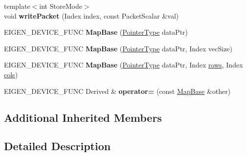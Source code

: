 \begin{DoxyCompactItemize}
{\footnotesize template$<$int Store\+Mode$>$ }\\void {\bfseries write\+Packet} (Index index, const Packet\+Scalar \&val)
\item 
\mbox{\label{class_eigen_1_1_map_base_3_01_derived_00_01_write_accessors_01_4_a41c11ab1e84f38b23ca4be87c62189d3}} 
E\+I\+G\+E\+N\+\_\+\+D\+E\+V\+I\+C\+E\+\_\+\+F\+U\+NC {\bfseries Map\+Base} (\mbox{\hyperlink{struct_eigen_1_1internal_1_1true__type}{Pointer\+Type}} data\+Ptr)
\item 
\mbox{\label{class_eigen_1_1_map_base_3_01_derived_00_01_write_accessors_01_4_a5f67bed14fedc7ab503238016e6bb36d}} 
E\+I\+G\+E\+N\+\_\+\+D\+E\+V\+I\+C\+E\+\_\+\+F\+U\+NC {\bfseries Map\+Base} (\mbox{\hyperlink{struct_eigen_1_1internal_1_1true__type}{Pointer\+Type}} data\+Ptr, Index vec\+Size)
\item 
\mbox{\label{class_eigen_1_1_map_base_3_01_derived_00_01_write_accessors_01_4_ab03acae12350d28e0cd58316e3347ef6}} 
E\+I\+G\+E\+N\+\_\+\+D\+E\+V\+I\+C\+E\+\_\+\+F\+U\+NC {\bfseries Map\+Base} (\mbox{\hyperlink{struct_eigen_1_1internal_1_1true__type}{Pointer\+Type}} data\+Ptr, Index \mbox{\hyperlink{class_eigen_1_1_map_base_3_01_derived_00_01_read_only_accessors_01_4_a78b3ab4983de51f112e6a062ac8f6ffd}{rows}}, Index \mbox{\hyperlink{class_eigen_1_1_map_base_3_01_derived_00_01_read_only_accessors_01_4_ad345a6b995b9894e9b076ee174876659}{cols}})
\item 
\mbox{\label{class_eigen_1_1_map_base_3_01_derived_00_01_write_accessors_01_4_a2ac24e4004f5bcd43f467c721afb8d6c}} 
E\+I\+G\+E\+N\+\_\+\+D\+E\+V\+I\+C\+E\+\_\+\+F\+U\+NC Derived \& {\bfseries operator=} (const \mbox{\hyperlink{class_eigen_1_1_map_base}{Map\+Base}} \&other)
\end{DoxyCompactItemize}
\subsection*{Additional Inherited Members}


\subsection{Detailed Description}
